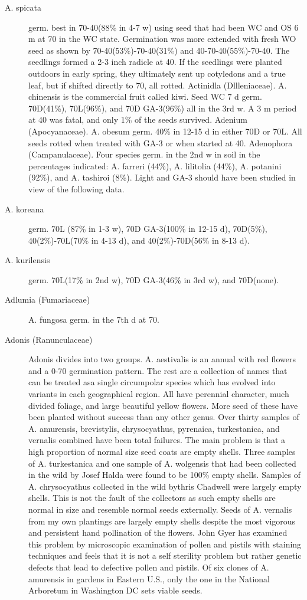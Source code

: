 \begin{description}
\item[A. spicata] germ. best in 70-40(88\% in 4-7 w) using seed that had been WC and
OS 6 m at 70 in the WC state. Germination was more extended with fresh WO seed as
shown by 70-40(53\%)-70-40(31\%) and 40-70-40(55\%)-70-40. The seedlings formed
a 2-3 inch radicle at 40. If the seedlings were planted outdoors in early spring, they
ultimately sent up cotyledons and a true leaf, but if shifted directly to 70, all rotted.
Actinidla (Dllleniaceae). A. chinensis is the commercial fruit called kiwi.
Seed WC 7 d germ. 70D(41\%), 70L(96\%), and 70D GA-3(96\%) all in the 3rd w. A 3 m
period at 40 was fatal, and only 1\% of the seeds survived.
Adenium (Apocyanaceae). A. obesum germ. 40\% in 12-15 d in either 70D
or 70L. All seeds rotted when treated with GA-3 or when started at 40.
Adenophora (Campanulaceae). Four species germ. in the 2nd w in soil in
the percentages indicated: A. farreri (44\%), A. lilitolia (44\%), A. potanini (92\%), and A.
tashiroi (8\%). Light and GA-3 should have been studied in view of the following data.

\item[A. koreana] germ. 70L (87\% in 1-3 w), 70D GA-3(100\% in 12-15 d), 70D(5\%),
40(2\%)-70L(70\% in 4-13 d), and 40(2\%)-70D(56\% in 8-13 d).
\item[A. kurilensis] germ. 70L(17\% in 2nd w), 70D GA-3(46\% in 3rd w), and
70D(none).

\item[Adlumia (Fumariaceae)] A. fungosa germ. in the 7th d at 70.

\item[Adonis (Ranunculaceae)] Adonis divides into two groups. A. aestivalis is
an annual with red flowers and a 0-70 germination pattern. The rest are a collection of
names that can be treated asa single circumpolar species which has evolved into
variants in each geographical region. All have perennial character, much divided
foliage, and large beautiful yellow flowers. More seed of these have been planted
without success than any other genus. Over thirty samples of A. amurensis, brevistylis,
chrysocyathus, pyrenaica, turkestanica, and vernalis combined have been total
failures. The main problem is that a high proportion of normal size seed coats are
empty shells. Three samples of A. turkestanica and one sample of A. wolgensis that
had been collected in the wild by Josef Halda were found to be 100\% empty shells.
Samples of A. chrysocyathus collected in the wild bythris Chadwell were largely
empty shells. This is not the fault of the collectors as such empty shells are normal in
size and resemble normal seeds externally. Seeds of A. vernalis from my own
plantings are largely empty shells despite the most vigorous and persistent hand
pollination of the flowers. John Gyer has examined this problem by microscopic
examination of pollen and pistils with staining techniques and feels that it is not a self
sterility problem but rather genetic defects that lead to defective pollen and pistils. Of
six clones of A. amurensis in gardens in Eastern U.S., only the one in the National
Arboretum in Washington DC sets viable seeds.


\end{description}
